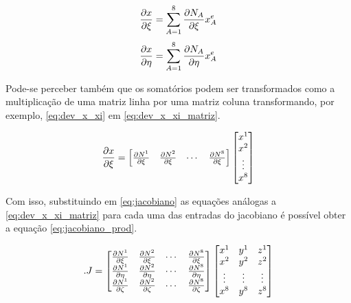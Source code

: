 \begin{equation}\label{eq:dev_x_xi}
\dxi[x] = \sum^8_{A=1} \dxi[N_A] x^e_A
\end{equation}
\begin{equation}
\deta[x] = \sum^8_{A=1} \deta[N_A] x^e_A
\end{equation}


Pode-se perceber também que os somatórios podem ser transformados como a multiplicação de uma matriz linha por uma matriz coluna transformando, por exemplo, \ref{eq:dev_x_xi} em \ref{eq:dev_x_xi_matriz}.

\begin{equation}\label{eq:dev_x_xi_matriz}
\dxi[x] =
\begin{bmatrix}
 \dxi[N^1]   & \dxi[N^2] & \cdots & \dxi[N^8]
\end{bmatrix}
\begin{bmatrix}
x^1    \\
x^2    \\
\vdots  \\
x^8
\end{bmatrix}
\end{equation}

Com isso, substituindo em \ref{eq:jacobiano} as equações análogas a \ref{eq:dev_x_xi_matriz} para cada uma das entradas do jacobiano é possível obter a equação \ref{eq:jacobiano_prod}.


\begin{equation}\label{eq:jacobiano_prod}.
J = \der
\begin{bmatrix}
x^1 & y^1 & z^1 \\
x^2 & y^2 & z^2 \\
\vdots & \vdots  & \vdots  \\
x^8 & y^8 & z^8 \\
\end{bmatrix}
\end{equation}


